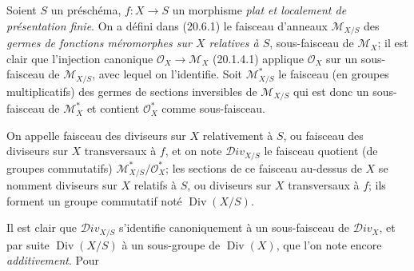 \begin{env}[21.15.1]
\label{IV.21.15.1}
Soient $S$ un préschéma, $f:X\to S$ un morphisme \emph{plat et localement de
présentation finie}. On a défini dans (20.6.1) le faisceau d'anneaux
$\mathscr M_{X/S}$ des \emph{germes de fonctions méromorphes sur $X$ relatives à
$S$}, sous-faisceau de $\mathscr M_X$; il est clair que l'injection canonique
$\mathcal O_X\to\mathscr M_X$ (20.1.4.1) applique $\mathcal O_X$ sur un
sous-faisceau de $\mathscr M_{X/S}$, avec lequel on l'identifie. Soit
$\mathscr M_{X/S}^*$ le faisceau (en groupes multiplicatifs) des germes de sections
inversibles de $\mathscr M_{X/S}$ qui est donc un sous-faisceau de $\mathscr M_X^*$
et contient $\mathcal O_X^*$ comme sous-faisceau.
\end{env}

\begin{definition}[21.15.2]
On appelle faisceau des diviseurs sur $X$ relativement à $S$, ou
faisceau des diviseurs sur $X$ transversaux à $f$, et on note
$\mathscr{D}iv_{X/S}$ le faisceau quotient (de groupes commutatifs)
$\mathscr M_{X/S}^*/\mathcal O_X^*$; les sections de ce faisceau au-dessus de $X$ se
nomment diviseurs sur $X$ relatifs à $S$, ou diviseurs sur $X$
transversaux à $f$; ils forment un groupe commutatif noté $\operatorname{Div}(X/S)$.
\end{definition}

Il est clair que $\mathscr{D}iv_{X/S}$ s'identifie canoniquement à un sous-faisceau de
$\mathscr{D}iv_X$, et par suite $\operatorname{Div}(X/S)$ à un sous-groupe de
$\operatorname{Div}(X)$, que l'on note encore \emph{additivement}. Pour
